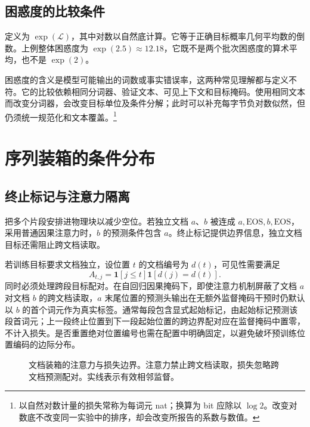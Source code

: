 \documentclass[../textbook.tex]{subfiles}
\begin{document}
\subsection{困惑度的比较条件}
定义为 $\exp(\mathcal L)$，其中对数以自然底计算。它等于正确目标概率几何平均数的倒数。上例整体困惑度为 $\exp(2.5)\approx12.18$，它既不是两个批次困惑度的算术平均，也不是 $\exp(2)$。

困惑度的含义是模型可能输出的词数或事实错误率，这两种常见理解都与定义不符。它的比较依赖相同分词器、验证文本、可见上下文和目标掩码。使用相同文本而改变分词器，会改变目标单位及条件分解；此时可以补充每字节负对数似然，但仍须统一规范化和文本覆盖。\footnote{以自然对数计量的损失常称为每词元 nat；换算为 bit 应除以 $\log 2$。改变对数底不改变同一实验中的排序，却会改变所报告的系数与数值。}

\section{序列装箱的条件分布}

\subsection{终止标记与注意力隔离}
把多个片段安排进物理块以减少空位。若独立文档 $a$、$b$ 被连成 $a,\mathrm{EOS},b,\mathrm{EOS}$，采用普通因果注意力时，$b$ 的预测条件包含 $a$。终止标记提供边界信息，独立文档目标还需阻止跨文档读取。

若训练目标要求文档独立，设位置 $t$ 的文档编号为 $d(t)$，可见性需要满足
\begin{equation}
 A_{t,j}=\mathbf1[j\le t]\mathbf1[d(j)=d(t)].
 \label{eq:pt-document-mask}
\end{equation}
同时必须处理跨段目标配对。在自回归因果掩码下，即使注意力机制屏蔽了文档 $a$ 对文档 $b$ 的跨文档读取，$a$ 末尾位置的预测头输出在无额外监督掩码干预时仍默认以 $b$ 的首个词元作为真实标签。通常每段包含显式起始标记，由起始标记预测该段首词元；上一段终止位置到下一段起始位置的跨边界配对应在监督掩码中置零，不计入损失。是否重置绝对位置编号也需在配置中明确固定，以避免破坏预训练位置编码的边际分布。

\begin{figure}[htbp]
\centering
{}
\caption[文档装箱的注意力与损失边界]{文档装箱的注意力与损失边界。注意力禁止跨文档读取，损失忽略跨文档预测配对。实线表示有效相邻监督。}\label{fig:pt-packing}
\end{figure}
\end{document}
